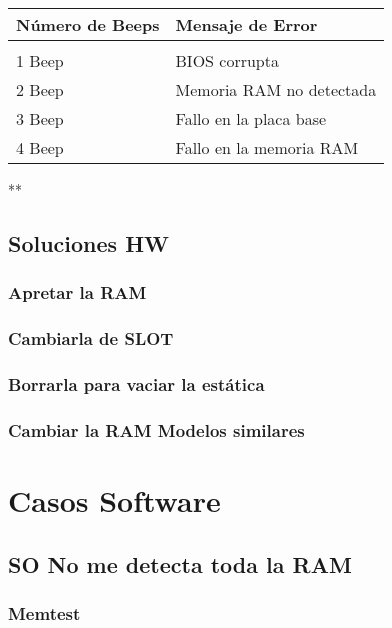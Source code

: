 \documentclass[11pt]{article}
\begin{document}
\begin{center}
\begin{tabular}{ll}
Número de Beeps & Mensaje de Error\\
\hline
 & \\
1 Beep & BIOS corrupta\\
2 Beep & Memoria RAM no detectada\\
3 Beep & Fallo en la placa base\\
4 Beep & Fallo en la memoria RAM\\
\end{tabular}
\end{center}

**


\subsection{Soluciones HW}
\label{sec:org75f6b08}

\subsubsection{Apretar la RAM}
\label{sec:org9db8bf7}
\subsubsection{Cambiarla de SLOT}
\label{sec:org473b274}
\subsubsection{Borrarla para vaciar la estática}
\label{sec:orged1e586}
\subsubsection{Cambiar la RAM Modelos similares}
\label{sec:org659cad6}

\section{Casos Software}
\label{sec:org41fb139}

\subsection{SO No me detecta toda la RAM}
\label{sec:org0868319}

\subsubsection{Memtest}
\label{sec:org35c6c99}
\end{document}
